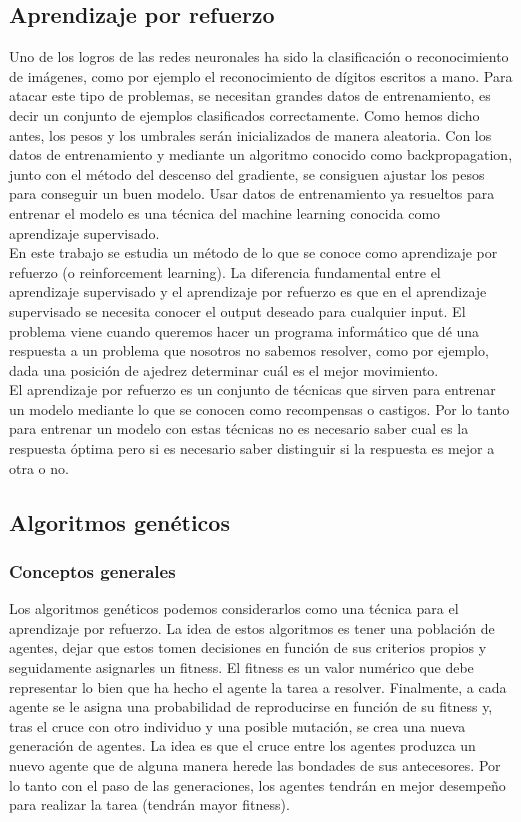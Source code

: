 \documentclass{article}
\begin{document}
\subsection{Aprendizaje por refuerzo}
Uno de los logros de las redes neuronales ha sido la clasificación o reconocimiento de imágenes, como por ejemplo el reconocimiento de dígitos escritos a mano. Para atacar este tipo de problemas, se necesitan grandes datos de entrenamiento, es decir un conjunto de ejemplos clasificados correctamente. Como hemos dicho antes, los pesos y los umbrales serán inicializados de manera aleatoria. Con los datos de entrenamiento y mediante un algoritmo conocido como backpropagation, junto con el método del descenso del gradiente, se consiguen ajustar los pesos para conseguir un buen modelo. Usar datos de entrenamiento ya resueltos para entrenar el modelo es una técnica del machine learning conocida como aprendizaje supervisado.\\

En este trabajo se estudia un método de lo que se conoce como aprendizaje por refuerzo (o reinforcement learning). La diferencia fundamental entre el aprendizaje supervisado y el aprendizaje por refuerzo es que en el aprendizaje supervisado se necesita conocer el output deseado para cualquier input. El problema viene cuando queremos hacer un programa informático que dé una respuesta a un problema que nosotros no sabemos resolver, como por ejemplo, dada una posición de ajedrez determinar cuál es el mejor movimiento.\\

El aprendizaje por refuerzo es un conjunto de técnicas que sirven para entrenar un modelo mediante lo que se conocen como recompensas o castigos. Por lo tanto para entrenar un modelo con estas técnicas no es necesario saber cual es la respuesta óptima pero si es necesario saber distinguir si la respuesta es mejor a otra o no.

\subsection{Algoritmos genéticos}
\subsubsection{Conceptos generales}
Los algoritmos genéticos podemos considerarlos como una técnica para el aprendizaje por refuerzo. La idea de estos algoritmos es tener una población de agentes, dejar que estos tomen decisiones en función de sus criterios propios y seguidamente asignarles un fitness. El fitness es un valor numérico que debe representar lo bien que ha hecho el agente la tarea a resolver. Finalmente, a cada agente se le asigna una probabilidad de reproducirse en función de su fitness y, tras el cruce con otro individuo y una posible mutación, se crea una nueva generación de agentes. La idea es que el cruce entre los agentes produzca un nuevo agente que de alguna manera herede las bondades de sus antecesores. Por lo tanto con el paso de las generaciones, los agentes tendrán en mejor desempeño para realizar la tarea (tendrán mayor fitness).\\
\end{document}

